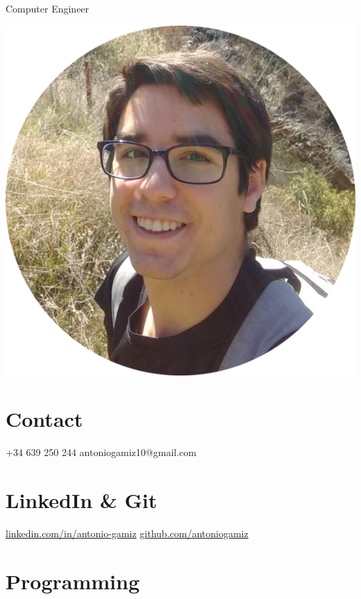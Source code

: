 \documentclass[]{friggeri-cv}
\begin{document}
      {Computer Engineer}
      

\begin{aside}
  \includegraphics[scale=0.18]{img/cara.png}
  \section{Contact}
    +34 639 250 244
    antoniogamiz10@gmail.com
    ~
  \section{LinkedIn \& Git}
    \href{www.linkedin.com/in/antonio-gamiz}{linkedin.com/in/antonio-gamiz}
    \href{https://github.com/antoniogamiz}{github.com/antoniogamiz}
    ~
    ~
    ~
  \section{Programming}
	~

\end{aside}
\end{document}
